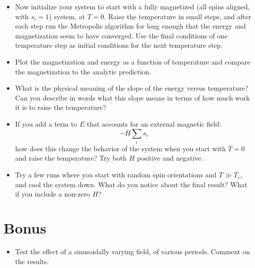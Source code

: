 \documentclass[11pt, preprint]{aastex}
\begin{document}
\begin{itemize}
\item Now initialize your system to start with a fully magnetized (all
  spins aligned, with $s_i = 1$) system, at $T=0$. Raise the
  temperature in small steps, and after each step run the Metropolis
  algorithm for long enough that the energy and magnetization seem to
  have converged. Use the final conditions of one temperature step as
  initial conditions for the next temperature step.
\item Plot the magnetization and energy as a function of temperature
  and compare the magnetization to the analytic prediction.
\item What is the physical meaning of the slope of the energy versus
  temperature?  Can you describe in words what this slope means in
  terms of how much work it is to raise the temperature?
\item If you add a term to $E$ that accounts for an external magnetic
  field:
  \begin{equation}
    -H \sum_i s_i
  \end{equation}
  how does this change the behavior of the system when you start with
  $T=0$ and raise the temperature?  Try both $H$ positive and
  negative.
\item Try a few runs where you start with random spin orientations and
  $T\gg T_c$, and cool the system down. What do you notice about the
  final result? What if you include a non-zero $H$?
\end{itemize}

\section{Bonus}

\begin{itemize}
\item Test the effect of a sinusoidally varying field, of various
  periods. Comment on the results.
\end{itemize}
\end{document}
